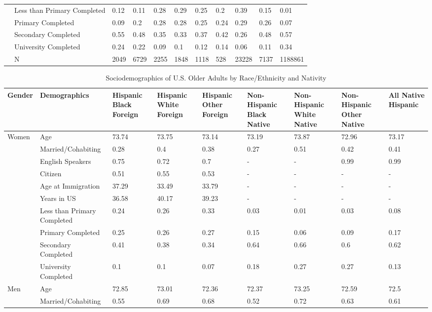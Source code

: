 \documentclass[
]{article}
\begin{document}
\begin{landscape}
\begin{table}[ht]
\begin{tabular}{l|l|lllllllll}
   & Less than Primary Completed & 0.12 & 0.11 & 0.28 & 0.29 & 0.25 & 0.2 & 0.39 & 0.15 & 0.01 \\ 
   & Primary Completed & 0.09 & 0.2 & 0.28 & 0.28 & 0.25 & 0.24 & 0.29 & 0.26 & 0.07 \\ 
   & Secondary Completed & 0.55 & 0.48 & 0.35 & 0.33 & 0.37 & 0.42 & 0.26 & 0.48 & 0.57 \\ 
   & University Completed & 0.24 & 0.22 & 0.09 & 0.1 & 0.12 & 0.14 & 0.06 & 0.11 & 0.34 \\ 
   & N & 2049 & 6729 & 2255 & 1848 & 1118 & 528 & 23228 & 7137 & 1188861 \\ 
   \hline
\end{tabular}
\endgroup
\end{table}

\begin{table}[ht]
\centering
\caption{Sociodemographics of U.S. Older Adults by Race/Ethnicity and Nativity} 
\begingroup\small
\begin{tabular}{l|l|p{1.5cm}p{1.5cm}p{1.5cm}p{1.5cm}p{1.5cm}p{1.5cm}p{1.5cm}}
  \hline
Gender & Demographics & Hispanic Black Foreign & Hispanic White Foreign & Hispanic Other Foreign & Non-Hispanic Black Native & Non-Hispanic White Native & Non-Hispanic Other Native & All Native Hispanic \\ 
  \hline
Women & Age & 73.74 & 73.75 & 73.14 & 73.19 & 73.87 & 72.96 & 73.17 \\ 
   & Married/Cohabiting & 0.28 & 0.4 & 0.38 & 0.27 & 0.51 & 0.42 & 0.41 \\ 
   & English Speakers & 0.75 & 0.72 & 0.7 & - & - & 0.99 & 0.99 \\ 
   & Citizen & 0.51 & 0.55 & 0.53 & - & - & - & - \\ 
   & Age at Immigration & 37.29 & 33.49 & 33.79 & - & - & - & - \\ 
   & Years in US & 36.58 & 40.17 & 39.23 & - & - & - & - \\ 
   & Less than Primary Completed & 0.24 & 0.26 & 0.33 & 0.03 & 0.01 & 0.03 & 0.08 \\ 
   & Primary Completed & 0.25 & 0.26 & 0.27 & 0.15 & 0.06 & 0.09 & 0.17 \\ 
   & Secondary Completed & 0.41 & 0.38 & 0.34 & 0.64 & 0.66 & 0.6 & 0.62 \\ 
   & University Completed & 0.1 & 0.1 & 0.07 & 0.18 & 0.27 & 0.27 & 0.13 \\ 
  Men & Age & 72.85 & 73.01 & 72.36 & 72.37 & 73.25 & 72.59 & 72.5 \\ 
   & Married/Cohabiting & 0.55 & 0.69 & 0.68 & 0.52 & 0.72 & 0.63 & 0.61 \\ 

\end{tabular}
\end{table}
\end{landscape}
\end{document}
